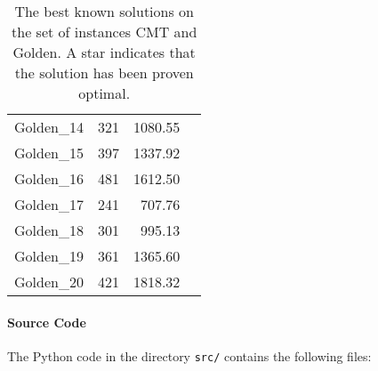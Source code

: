 \begin{table}[t]
\begin{minipage}{0.48\textwidth}
\begin{tabular}{lrrr}
Golden\_14 & 321 &	1080.55	\\
Golden\_15 & 397 &	1337.92	\\
Golden\_16 & 481 &	1612.50	\\
Golden\_17 & 241 &	707.76	\\
Golden\_18 & 301 &	995.13	\\
Golden\_19 & 361 &	1365.60	\\
Golden\_20 & 421 &	1818.32	\\
\bottomrule
\end{tabular}
\end{minipage}
\caption{\label{bks} The best known solutions on the set of instances
  CMT and Golden. A star indicates that the solution has been proven optimal.}
\end{table}



\paragraph{Source Code}
The Python code in the directory \verb!src/! contains the following files: 

